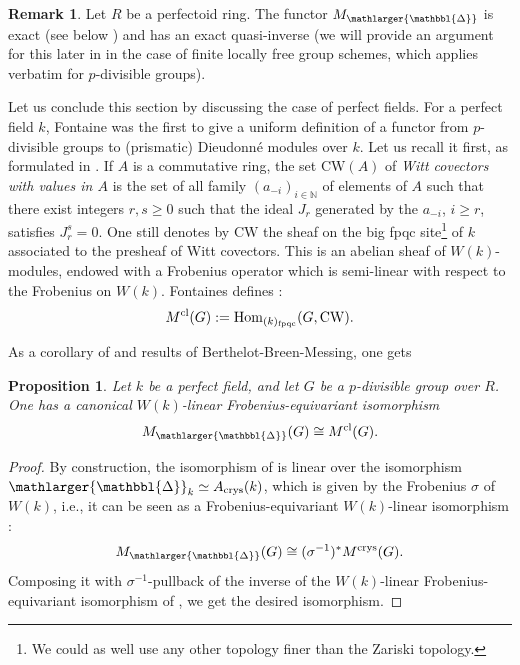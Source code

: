 \documentclass{amsart}
\newcommand{\prism}{{\mathlarger{\mathbbl{\Delta}}}}
\theoremstyle{plain}
\newtheorem{proposition}[theorem]{Proposition}
\theoremstyle{definition}
\newtheorem{remark}[theorem]{Remark}
\begin{document}
\begin{remark}
  \label{sec:comp-with-form-remark-exactness-of-equivalences}
Let $R$ be a perfectoid ring. The functor $M_{\prism}$ is exact (see below ) and has an exact quasi-inverse (we will provide an argument for this later in  in the case of finite locally free group schemes, which applies verbatim for $p$-divisible groups). 
\end{remark}


Let us conclude this section by discussing the case of perfect fields. For a perfect field $k$, Fontaine \cite{fontaine_groupes_p_divisibles_sur_les_corps_locaux} was the first to give a uniform definition of a functor from $p$-divisible groups to (prismatic) Dieudonn\'e modules over $k$. Let us recall it first, as formulated in \cite[\S 4.1]{berthelot_messing_theorie_de_dieudonne_cristalline_III}. If $A$ is a commutative ring, the set $\mathrm{CW}(A)$ of \textit{Witt covectors with values in $A$} is the set of all family $(a_{-i})_{i\in \mathbb{N}}$ of elements of $A$ such that there exist integers $r, s\geq 0$ such that the ideal $J_r$ generated by the $a_{-i}$, $i\geq r$, satisfies $J_r^s=0$. One still denotes by $\mathrm{CW}$ the sheaf on the big fpqc site\footnote{We could as well use any other topology finer than the Zariski topology.} of $k$ associated to the presheaf of Witt covectors. This is an abelian sheaf of $W(k)$-modules, endowed with a Frobenius operator which is semi-linear with respect to the Frobenius on $W(k)$. Fontaines defines :
\[ M^{\rm cl}(G):= \mathrm{Hom}_{(k)_{\rm fpqc}}(G, \mathrm{CW}). \]

As a corollary of  and results of Berthelot-Breen-Messing, one gets 
\begin{proposition}
Let $k$ be a perfect field, and let $G$ be a $p$-divisible group over $R$. One has a canonical $W(k)$-linear Frobenius-equivariant isomorphism
\[ M_{\prism}(G) \cong M^{\rm cl}(G). \]
\end{proposition}
\begin{proof}
By construction, the isomorphism of  is linear over the isomorphism $\prism_k \simeq A_{\rm crys}(k)$, which is given by the Frobenius $\sigma$ of $W(k)$, i.e., it can be seen as a Frobenius-equivariant $W(k)$-linear isomorphism :
\[ M_{\prism}(G) \cong (\sigma^{-1})^* M^{\rm crys}(G). \]
Composing it with $\sigma^{-1}$-pullback of the inverse of the $W(k)$-linear Frobenius-equivariant isomorphism of \cite[Theorem 4.2.14]{berthelot_messing_theorie_de_dieudonne_cristalline_III}, we get the desired isomorphism.
\end{proof}
\end{document}
